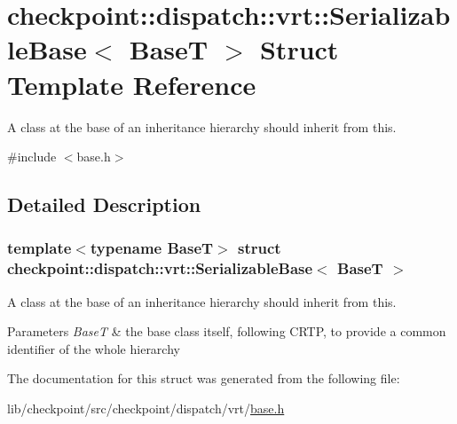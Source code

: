 \hypertarget{structcheckpoint_1_1dispatch_1_1vrt_1_1_serializable_base}{}\section{checkpoint\+:\+:dispatch\+:\+:vrt\+:\+:Serializable\+Base$<$ BaseT $>$ Struct Template Reference}
\label{structcheckpoint_1_1dispatch_1_1vrt_1_1_serializable_base}


A class at the base of an inheritance hierarchy should inherit from this.  




{\ttfamily \#include $<$base.\+h$>$}



\subsection{Detailed Description}
\subsubsection*{template$<$typename BaseT$>$\newline
struct checkpoint\+::dispatch\+::vrt\+::\+Serializable\+Base$<$ Base\+T $>$}

A class at the base of an inheritance hierarchy should inherit from this. 


\begin{DoxyParams}{Parameters}
{\em BaseT} & the base class itself, following C\+R\+TP, to provide a common identifier of the whole hierarchy \\
\hline
\end{DoxyParams}


The documentation for this struct was generated from the following file\+:\begin{DoxyCompactItemize}
\item 
lib/checkpoint/src/checkpoint/dispatch/vrt/\hyperlink{lib_2checkpoint_2src_2checkpoint_2dispatch_2vrt_2base_8h}{base.\+h}\end{DoxyCompactItemize}
